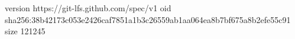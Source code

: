 version https://git-lfs.github.com/spec/v1
oid sha256:38b42173c053e2426caf7851a1b3c26559ab1aa064ea8b7bf675a8b2efe55c91
size 121245
